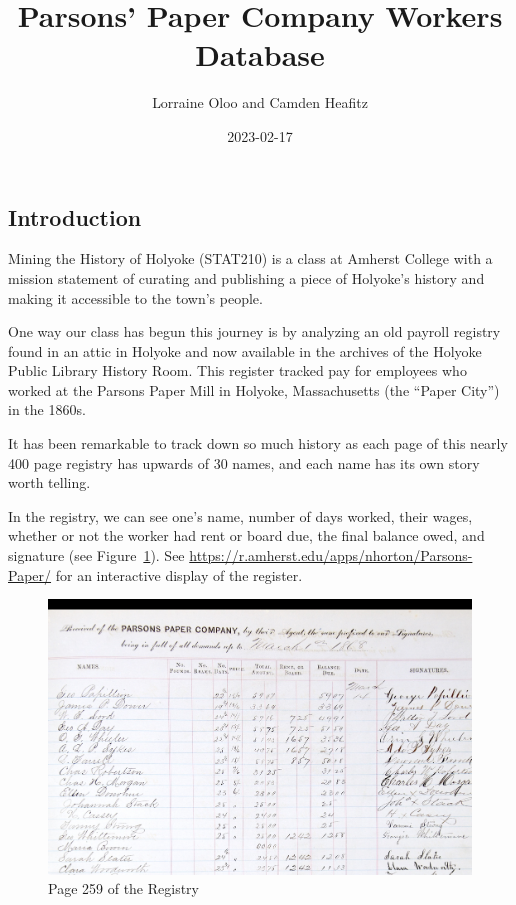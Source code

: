 \documentclass[
  letterpaper,
  DIV=11,
  numbers=noendperiod]{scrartcl}
\title{Parsons' Paper Company Workers Database}
\author{Lorraine Oloo and Camden Heafitz}
\date{2023-02-17}
\begin{document}
\maketitle
\ifdefined\Shaded\renewenvironment{Shaded}{\begin{tcolorbox}[breakable, boxrule=0pt, borderline west={3pt}{0pt}{shadecolor}, frame hidden, enhanced, sharp corners, interior hidden]}{\end{tcolorbox}}\fi

\hypertarget{introduction}{%
\subsection{Introduction}\label{introduction}}

Mining the History of Holyoke (STAT210) is a class at Amherst College
with a mission statement of curating and publishing a piece of Holyoke's
history and making it accessible to the town's people.

One way our class has begun this journey is by analyzing an old payroll
registry found in an attic in Holyoke and now available in the archives
of the Holyoke Public Library History Room. This register tracked pay
for employees who worked at the Parsons Paper Mill in Holyoke,
Massachusetts (the ``Paper City'') in the 1860s.

It has been remarkable to track down so much history as each page of
this nearly 400 page registry has upwards of 30 names, and each name has
its own story worth telling.

In the registry, we can see one's name, number of days worked, their
wages, whether or not the worker had rent or board due, the final
balance owed, and signature (see Figure~\ref{fig-sample}). See
\url{https://r.amherst.edu/apps/nhorton/Parsons-Paper/} for an
interactive display of the register.

\begin{figure}

{\centering \includegraphics[width=\textwidth,height=0.47\textheight]{Registry_page_header.jpeg}

}

\caption{\label{fig-sample}Page 259 of the Registry}

\end{figure}
\end{document}
